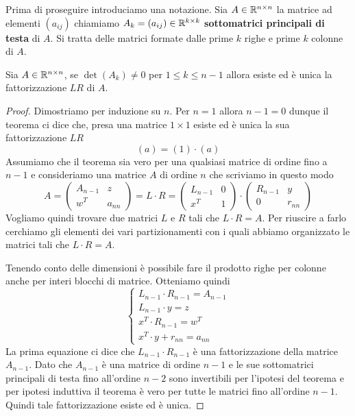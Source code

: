 Prima di proseguire introduciamo una notazione. Sia $A \in \mathbb{R}^{n \times n}$ la matrice ad elementi $(a_{ij})$
chiamiamo $A_k = (a_{ij}) \in \mathbb{R}^{k \times k}$ \textbf{sottomatrici principali di testa} di $A$. Si tratta delle
matrici formate dalle prime $k$ righe e prime $k$ colonne di $A$.

\begin{theorem}
	Sia $A \in \mathbb{R}^{n \times n}$, se $\det(A_k) \neq 0$ per $1 \leq k \leq n-1$ allora esiste ed è unica la
	fattorizzazione $LR$ di $A$.
	\begin{proof}
		Dimostriamo per induzione su $n$. Per $n = 1$ allora $n-1 = 0$ dunque il teorema ci dice che, presa
		una matrice $1 \times 1$ esiste ed è unica la sua fattorizzazione $LR$
		\[ (a) = (1) \cdot (a) \]
		Assumiamo che il teorema sia vero per una qualsiasi matrice di ordine fino a $n-1$ e consideriamo una
		matrice $A$ di ordine $n$ che scriviamo in questo modo
		\[
			A = \begin{pmatrix}
				A_{n-1} & z      \\
				w^T     & a_{nn}
			\end{pmatrix} = L \cdot R =
			\begin{pmatrix}
				L_{n-1} & 0 \\
				x^T     & 1
			\end{pmatrix} \cdot
			\begin{pmatrix}
				R_{n-1} & y      \\
				0       & r_{nn}
			\end{pmatrix}
		\]
		Vogliamo quindi trovare due matrici $L$ e $R$ tali che $L \cdot R = A$. Per riuscire a farlo cerchiamo
		gli elementi dei vari partizionamenti con i quali abbiamo organizzato le matrici tali che $L \cdot R = A$.

		Tenendo conto delle dimensioni è possibile fare il prodotto righe per colonne anche per interi blocchi di
		matrice. Otteniamo quindi
		\[
			\begin{cases}
				L_{n-1} \cdot R_{n-1} = A_{n-1} \\
				L_{n-1} \cdot y = z             \\
				x^T \cdot R_{n-1} = w^T         \\
				x^T \cdot y + r_{nn} = a_{nn}
			\end{cases}
		\]
		La prima equazione ci dice che $L_{n-1} \cdot R_{n-1}$ è una fattorizzazione della matrice $A_{n-1}$.
		Dato che $A_{n-1}$ è una matrice di ordine $n-1$ e le sue sottomatrici principali di testa fino all'ordine
		$n-2$ sono invertibili per l'ipotesi del teorema e per ipotesi induttiva il teorema è vero per tutte le
		matrici fino all'ordine $n-1$. Quindi tale fattorizzazione esiste ed è unica.


\end{proof}
\end{theorem}
